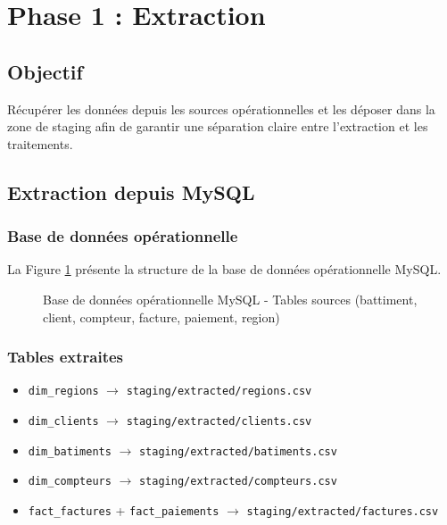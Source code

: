 \documentclass[12pt,a4paper]{report}
\begin{document}
\section{Phase 1 : Extraction}

\subsection{Objectif}

Récupérer les données depuis les sources opérationnelles et les déposer dans la zone de staging afin de garantir une séparation claire entre l'extraction et les traitements.

\subsection{Extraction depuis MySQL}

\subsubsection{Base de données opérationnelle}

La Figure \ref{fig:mysql_operational_db} présente la structure de la base de données opérationnelle MySQL.

\begin{figure}[H]
    \centering
    \caption{Base de données opérationnelle MySQL - Tables sources (battiment, client, compteur, facture, paiement, region)}
    \label{fig:mysql_operational_db}
\end{figure}

\subsubsection{Tables extraites}

\begin{itemize}
    \item \texttt{dim\_regions} $\rightarrow$ \texttt{staging/extracted/regions.csv}
    \item \texttt{dim\_clients} $\rightarrow$ \texttt{staging/extracted/clients.csv}
    \item \texttt{dim\_batiments} $\rightarrow$ \texttt{staging/extracted/batiments.csv}
    \item \texttt{dim\_compteurs} $\rightarrow$ \texttt{staging/extracted/compteurs.csv}
    \item \texttt{fact\_factures} + \texttt{fact\_paiements} $\rightarrow$ \texttt{staging/extracted/factures.csv}
\end{itemize}
\end{document}
